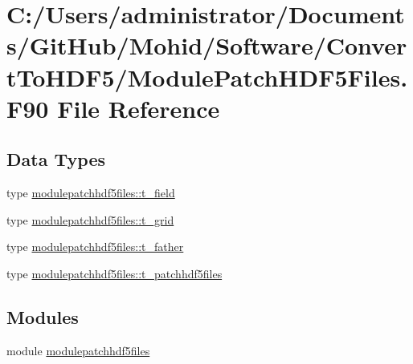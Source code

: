 \hypertarget{_module_patch_h_d_f5_files_8_f90}{}\section{C\+:/\+Users/administrator/\+Documents/\+Git\+Hub/\+Mohid/\+Software/\+Convert\+To\+H\+D\+F5/\+Module\+Patch\+H\+D\+F5\+Files.F90 File Reference}
\label{_module_patch_h_d_f5_files_8_f90}
\subsection*{Data Types}
\begin{DoxyCompactItemize}
\item 
type \mbox{\hyperlink{structmodulepatchhdf5files_1_1t__field}{modulepatchhdf5files\+::t\+\_\+field}}
\item 
type \mbox{\hyperlink{structmodulepatchhdf5files_1_1t__grid}{modulepatchhdf5files\+::t\+\_\+grid}}
\item 
type \mbox{\hyperlink{structmodulepatchhdf5files_1_1t__father}{modulepatchhdf5files\+::t\+\_\+father}}
\item 
type \mbox{\hyperlink{structmodulepatchhdf5files_1_1t__patchhdf5files}{modulepatchhdf5files\+::t\+\_\+patchhdf5files}}
\end{DoxyCompactItemize}
\subsection*{Modules}
\begin{DoxyCompactItemize}
\item 
module \mbox{\hyperlink{namespacemodulepatchhdf5files}{modulepatchhdf5files}}
\end{DoxyCompactItemize}
